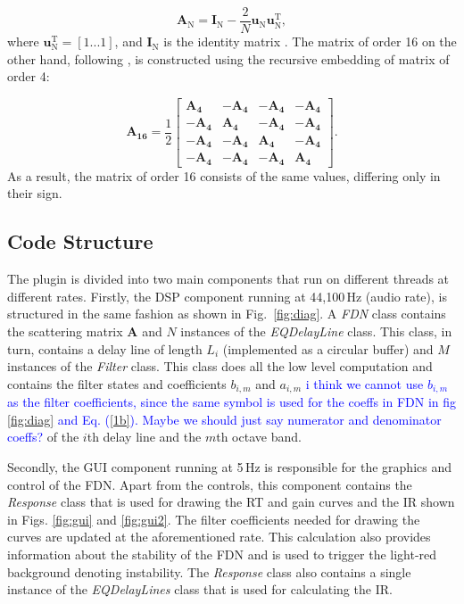 \documentclass[twoside,a4paper]{article}
\newcommand{\karolina}[1]{\textcolor{blue}{#1}}
\begin{document}
\begin{equation}
\mathbf{A}_\textrm{N} = \mathbf{I}_\textrm{N} - \frac{2}{N} \mathbf{u}_\textrm{N}\mathbf{u}_\textrm{N}^\textrm{T},
\label{eq:house}
\end{equation}
where $\mathbf{u}_\textrm{N}^\textrm{T} = [1...1]$, and $\mathbf{I}_\textrm{N}$ is the identity matrix \cite{Jot:1997:icm}. The matrix of order 16 on the other hand, following \cite{PASPWEB2010}, is constructed using the recursive embedding of matrix of order 4:

\begin{equation}
\mathbf{A_{16}} = \frac{1}{2}
    \begin{bmatrix}
         \mathbf{A_{4}}& -\mathbf{A_{4}}& -\mathbf{A_{4}} & -\mathbf{A_{4}} \\
        -\mathbf{A_{4}} & \mathbf{A_{4}} & -\mathbf{A_{4}}& -\mathbf{A_{4}}\\
        -\mathbf{A_{4}} & -\mathbf{A_{4}} & \mathbf{A_{4}} & -\mathbf{A_{4}} \\
         -\mathbf{A_{4}} & -\mathbf{A_{4}} & -\mathbf{A_{4}} & \mathbf{A_{4}}
    \end{bmatrix}.
    \label{eq:embed}
\end{equation}
As a result, the matrix of order 16 consists of the same values, differing only in their sign.


\subsection{Code Structure}\label{sec:codeStructure}
The plugin is divided into two main components that run on different threads at different rates. Firstly, the DSP component running at 44,100\,Hz (audio rate), is structured in the same fashion as shown in Fig.~\ref{fig:diag}. A \textit{FDN} class contains the scattering matrix $\textbf{A}$ and $N$ instances of the \textit{EQDelayLine} class. This class, in turn, contains a delay line of length $L_i$ (implemented as a circular buffer) and $M$ instances of the \textit{Filter} class. This class does all the low level computation and contains the filter states and coefficients $b_{i,m}$ and $a_{i,m}$ \karolina{i think we cannot use  $b_{i,m}$ as the filter coefficients, since the same symbol is used for the coeffs in FDN in fig \ref{fig:diag} and Eq. (\ref{1b}). Maybe we should just say numerator and denominator coeffs?} of the $i$th delay line and the $m$th octave band.

Secondly, the GUI component running at 5\,Hz is responsible for the graphics and control of the FDN. Apart from the controls, this component contains the \textit{Response} class that is used for drawing the RT and gain curves and the IR shown in Figs. \ref{fig:gui} and \ref{fig:gui2}. The filter coefficients needed for drawing the curves are updated at the aforementioned rate. This calculation also provides information about the stability of the FDN and is used to trigger the light-red background denoting instability. The \textit{Response} class also contains a single instance of the \textit{EQDelayLines} class that is used for calculating the IR.
\end{document}
